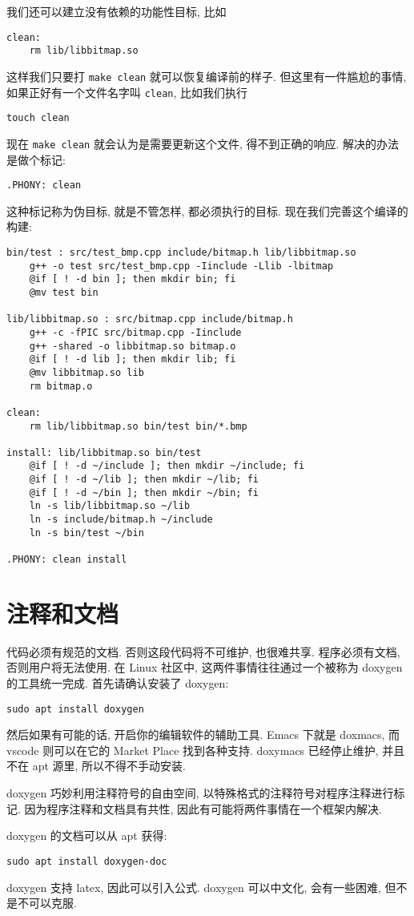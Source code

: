 \documentclass[a4paper]{ctexart}
\begin{document}
我们还可以建立没有依赖的功能性目标, 比如
\begin{verbatim}
clean:
	rm lib/libbitmap.so
\end{verbatim}
这样我们只要打 \verb|make clean| 就可以恢复编译前的样子.
但这里有一件尴尬的事情, 如果正好有一个文件名字叫 \verb|clean|, 比如我们执行
\begin{verbatim}
touch clean
\end{verbatim}
现在 \verb|make clean| 就会认为是需要更新这个文件, 得不到正确的响应. 解决的办法是做个标记:
\begin{verbatim}
.PHONY: clean
\end{verbatim}
这种标记称为伪目标, 就是不管怎样, 都必须执行的目标. 现在我们完善这个编译的构建:
\begin{verbatim}
bin/test : src/test_bmp.cpp include/bitmap.h lib/libbitmap.so
	g++ -o test src/test_bmp.cpp -Iinclude -Llib -lbitmap 
	@if [ ! -d bin ]; then mkdir bin; fi
	@mv test bin

lib/libbitmap.so : src/bitmap.cpp include/bitmap.h 
	g++ -c -fPIC src/bitmap.cpp -Iinclude 
	g++ -shared -o libbitmap.so bitmap.o
	@if [ ! -d lib ]; then mkdir lib; fi
	@mv libbitmap.so lib
	rm bitmap.o

clean:
	rm lib/libbitmap.so bin/test bin/*.bmp

install: lib/libbitmap.so bin/test
	@if [ ! -d ~/include ]; then mkdir ~/include; fi
	@if [ ! -d ~/lib ]; then mkdir ~/lib; fi
	@if [ ! -d ~/bin ]; then mkdir ~/bin; fi
	ln -s lib/libbitmap.so ~/lib
	ln -s include/bitmap.h ~/include
	ln -s bin/test ~/bin

.PHONY: clean install
\end{verbatim}

\section{注释和文档}

代码必须有规范的文档. 否则这段代码将不可维护, 也很难共享. 程序必须有文档, 否则用户将无法使用.
在 Linux 社区中, 这两件事情往往通过一个被称为 doxygen 的工具统一完成.
首先请确认安装了 doxygen:
\begin{verbatim}
sudo apt install doxygen
\end{verbatim}
然后如果有可能的话, 开启你的编辑软件的辅助工具. Emacs 下就是 doxmacs, 而 vscode 则可以在它的
Market Place 找到各种支持. doxymacs 已经停止维护, 并且不在 apt 源里, 所以不得不手动安装.

doxygen 巧妙利用注释符号的自由空间, 以特殊格式的注释符号对程序注释进行标记. 因为程序注释和文档具有共性,
因此有可能将两件事情在一个框架内解决.

doxygen 的文档可以从 apt 获得:
\begin{verbatim}
sudo apt install doxygen-doc
\end{verbatim}

doxygen 支持 latex, 因此可以引入公式. doxygen 可以中文化, 会有一些困难, 但不是不可以克服.



\end{document}
